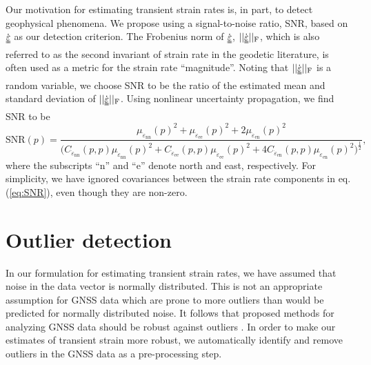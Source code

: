 \documentclass[extra,mreferee]{gji}
\newcommand*{\du}[1]{\uuline{#1}}
\begin{document}
Our motivation for estimating transient strain rates is, in part, to detect geophysical phenomena. We propose using a signal-to-noise ratio, SNR, based on $\dot{\du{\varepsilon}}$ as our detection criterion. The Frobenius norm of $\dot{\du{\varepsilon}}$, $||\dot{\du{\varepsilon}}||_\mathrm{F}$, which is also referred to as the second invariant of strain rate in the geodetic literature, is often used as a metric for the strain rate ``magnitude''. Noting that $||\dot{\du{\varepsilon}}||_\mathrm{F}$ is a random variable, we choose SNR to be the ratio of the estimated mean and standard deviation of $||\dot{\du{\varepsilon}}||_\mathrm{F}$. Using nonlinear uncertainty propagation, we find SNR to be  
\begin{equation}\label{eq:SNR}
\mathrm{SNR}(p) = \frac{\mu_{\dot{\varepsilon}_\mathrm{nn}}(p)^2 +
                        \mu_{\dot{\varepsilon}_\mathrm{ee}}(p)^2 +
                        2\mu_{\dot{\varepsilon}_\mathrm{en}}(p)^2}
                       {\big(C_{\dot{\varepsilon}_\mathrm{nn}}(p,p)\mu_{\dot{\varepsilon}_\mathrm{nn}}(p)^2 + 
                              C_{\dot{\varepsilon}_\mathrm{ee}}(p,p)\mu_{\dot{\varepsilon}_\mathrm{ee}}(p)^2 + 
                              4C_{\dot{\varepsilon}_\mathrm{en}}(p,p)\mu_{\dot{\varepsilon}_\mathrm{en}}(p)^2
                        \big)^{\frac{1}{2}}}
,
\end{equation}
where the subscripts ``n'' and ``e'' denote north and east, respectively. For simplicity, we have ignored covariances between the strain rate components in eq. (\ref{eq:SNR}), even though they are non-zero.  

\section{Outlier detection}\label{sec:Outlier}
In our formulation for estimating transient strain rates, we have assumed that noise in the data vector is normally distributed. This is not an appropriate assumption for GNSS data which are prone to more outliers than would be predicted for normally distributed noise. It follows that proposed methods for analyzing GNSS data should be robust against outliers \citep[e.g.,][]{Blewitt2016}. In order to make our estimates of transient strain more robust, we automatically identify and remove outliers in the GNSS data as a pre-processing step.
\end{document}
